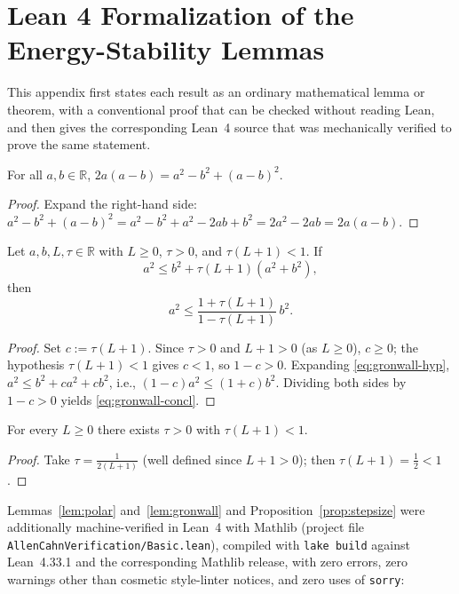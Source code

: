 \documentclass[symmetry,article,submit,moreauthors]{Definitions/mdpi}
\begin{document}
\appendixstart
\appendix
\section{Lean 4 Formalization of the Energy-Stability Lemmas}\label{app:lean}

This appendix first states each result as an ordinary mathematical lemma or theorem, with a conventional proof that can be checked without reading Lean, and then gives the corresponding Lean~4 source that was mechanically verified to prove the same statement.

\begin{Lemma}\label{lem:polar}
For all $a,b\in\mathbb{R}$, $2a(a-b) = a^2-b^2+(a-b)^2$.
\end{Lemma}
\begin{proof}
Expand the right-hand side: $a^2-b^2+(a-b)^2 = a^2-b^2+a^2-2ab+b^2 = 2a^2-2ab = 2a(a-b)$.
\end{proof}

\begin{Lemma}\label{lem:gronwall}
Let $a,b,L,\tau\in\mathbb{R}$ with $L\ge0$, $\tau>0$, and $\tau(L+1)<1$. If
\begin{equation}\label{eq:gronwall-hyp}
a^2 \le b^2+\tau(L+1)(a^2+b^2),
\end{equation}
then
\begin{equation}\label{eq:gronwall-concl}
a^2 \le \frac{1+\tau(L+1)}{1-\tau(L+1)}\,b^2.
\end{equation}
\end{Lemma}
\begin{proof}
Set $c:=\tau(L+1)$. Since $\tau>0$ and $L+1>0$ (as $L\ge0$), $c\ge0$; the hypothesis $\tau(L+1)<1$ gives $c<1$, so $1-c>0$. Expanding \eqref{eq:gronwall-hyp}, $a^2\le b^2+ca^2+cb^2$, i.e., $(1-c)a^2\le(1+c)b^2$. Dividing both sides by $1-c>0$ yields \eqref{eq:gronwall-concl}.
\end{proof}

\begin{Proposition}\label{prop:stepsize}
For every $L\ge0$ there exists $\tau>0$ with $\tau(L+1)<1$.
\end{Proposition}
\begin{proof}
Take $\tau=\frac{1}{2(L+1)}$ (well defined since $L+1>0$); then $\tau(L+1)=\tfrac12<1$.
\end{proof}

Lemmas~\ref{lem:polar} and~\ref{lem:gronwall} and Proposition~\ref{prop:stepsize} were additionally machine-verified in Lean~4 with Mathlib (project file \texttt{AllenCahnVerification/Basic.lean}), compiled with \texttt{lake build} against Lean~4.33.1 and the corresponding Mathlib release, with zero errors, zero warnings other than cosmetic style-linter notices, and zero uses of \texttt{sorry}:
\end{document}
